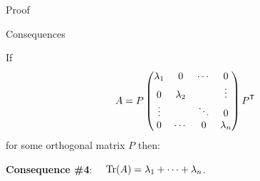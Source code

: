 \documentclass{beamer}
\begin{document}
\begin{frame}[t]{Proof}
	\grid

\end{frame}

\begin{frame}[t]{Consequences}
	\grid

	If 
	$$
	A = P
	\begin{pmatrix}
		\lambda_1 & 0 & \cdots & 0 \\
		0 & \lambda_2 & & \vdots \\
		\vdots &  & \ddots & 0 \\
		0 & \cdots & 0 & \lambda_n \\
	\end{pmatrix}
	P^{{\sf T}}
	$$
	for some orthogonal matrix $P$ then:

	\vspace{1cm}

	\textbf{Consequence \#4}: \ \ ${{\rm Tr}}(A) = \lambda_1 + \cdots + \lambda_n$.
\end{frame}
\end{document}
